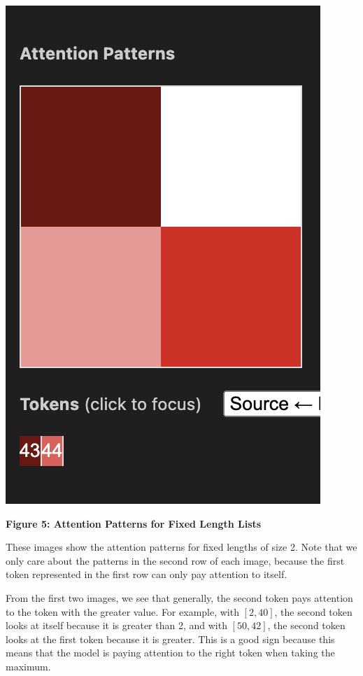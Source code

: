 \documentclass{article}
\begin{document}
\begin{center}
    \includegraphics[scale=0.4]{att_fixed_edge.png}

    \textbf{Figure 5: Attention Patterns for Fixed Length Lists}
\end{center}

These images show the attention patterns for fixed lengths of size 2. Note that we only care about the patterns in the second row of each image, because the first token represented in the first row can only pay attention to itself. 

From the first two images, we see that generally, the second token pays attention to the token with the greater value. For example, with $[2, 40]$, the second token looks at itself because it is greater than 2, and with $[50, 42]$, the second token looks at the first token because it is greater. This is a good sign because this means that the model is paying attention to the right token when taking the maximum. 
\end{document}
